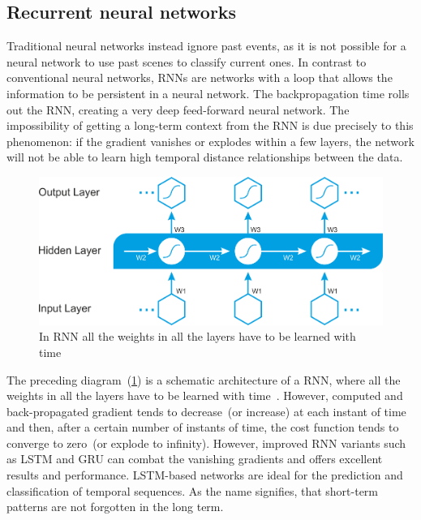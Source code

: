 \subsection{Recurrent neural networks}
Traditional neural networks instead ignore past events, as it is not possible for a neural network to use past scenes to classify current ones. In contrast to conventional neural networks, RNNs are networks with a loop that allows the information to be persistent in a neural network. The backpropagation time rolls out the RNN, creating a very deep feed-forward neural network. The impossibility of getting a long-term context from the RNN is due precisely to this phenomenon: if the gradient vanishes or explodes within a few layers, the network will not be able to learn high temporal distance relationships between the data. 

\begin{figure}[h]
    \centering
    \includegraphics[scale=0.3]{images/B09698_06_4.png}
    \caption{In RNN all the weights in all the layers have to be learned with time~\cite{karimDLTF2018}}
    \label{fig:rnn_theory1}
    \vspace{-2mm}
\end{figure}

\hspace*{3.5mm} The preceding diagram~(\cref{fig:rnn_theory1}) is a schematic architecture of a RNN, where all the weights in all the layers have to be learned with time~\cite{karimDLTF2018}. However, computed and back-propagated gradient tends to decrease~(or increase) at each instant of time and then, after a certain number of instants of time, the cost function tends to converge to zero~(or explode to infinity). However, improved RNN variants such as LSTM and GRU can combat the vanishing gradients and offers excellent results and performance. LSTM-based networks are ideal for the prediction and classification of temporal sequences. As the name signifies, that short-term patterns are not forgotten in the long term. 

